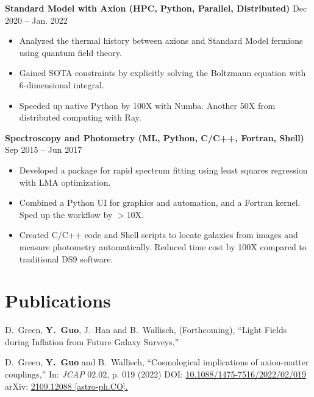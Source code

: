 \documentclass[letterpaper,12pt]{article}
\newenvironment{zitemize}{
\begin{itemize} \vspace{-.8em}\itemsep 0pt \parskip 0pt}
{\end{itemize}\vspace{-.7em}}
\newcommand{\proglang}[1]{#1}
\begin{document}
\textbf{Standard Model with Axion (HPC, Python, Parallel, Distributed)} \hfill Dec 2020 -- Jan. 2022 \\
\begin{zitemize}
    \item Analyzed the thermal history between axions and Standard Model fermions using quantum field theory. 
    \item Gained SOTA constraints by explicitly solving the Boltzmann equation with 6-dimensional integral.
    \item Speeded up native \proglang{Python} by 100X with \proglang{Numba}. Another 50X from distributed computing with \proglang{Ray}.
\end{zitemize}

\textbf{Spectroscopy and Photometry (ML, Python, C/C++, Fortran, Shell)} \hfill Sep 2015 -- Jun 2017 \\
\begin{zitemize}
    \item Developed a package for rapid spectrum fitting using least squares regression with LMA optimization.
    \item Combined a \proglang{Python} UI for graphics and automation, and a \proglang{Fortran} kernel. Sped up the workflow by $>$10X. 
    \item Created \proglang{C/C++} code and \proglang{Shell} scripts to locate galaxies from images and measure photometry automatically. Reduced time cost by 100X compared to traditional DS9 software.
\end{zitemize}


\section{Publications}

D.~Green, \textbf{Y.~Guo}, J.~Han and B.~Wallisch, (Forthcoming),
``Light Fields during Inflation from Future Galaxy Surveys,''

D.~Green, \textbf{Y.~Guo} and B.~Wallisch,
``Cosmological implications of axion-matter couplings,''
In: \textit{JCAP} 02.02, p. 019 (2022)
DOI: \href{https://iopscience.iop.org/article/10.1088/1475-7516/2022/02/019}{10.1088/1475-7516/2022/02/019}
arXiv: \href{https://arxiv.org/abs/2109.12088?context=hep-ph}{2109.12088 [astro-ph.CO].}
\end{document}
